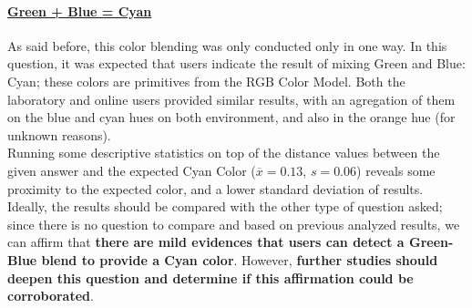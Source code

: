 \paragraph{\ul{Green + Blue = Cyan}}
%
As said before, this color blending was only conducted only in one way. In this question, it was expected that users indicate the result of mixing Green and Blue: Cyan; these colors are primitives from the RGB Color Model. Both the laboratory
and online users provided similar results, with an agregation of them on the blue and cyan hues on both environment, and also in the orange hue (for unknown reasons).  \\
%
Running some descriptive statistics on top of the distance values between the given answer and the expected Cyan Color ($\overline{x} = 0.13$, $s = 0.06$) reveals some proximity to the expected color, and a lower standard deviation of results.
Ideally, the results should be compared with the other type of question asked; since there is no question to compare and based on previous analyzed results, we can affirm that \textbf{there are mild evidences that users can detect a Green-Blue blend
to provide a Cyan color}. However, \textbf{further studies should deepen this question and determine if this affirmation could be corroborated}.
%
